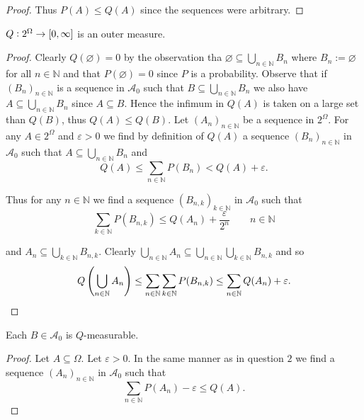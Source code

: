 \begin{enumerate}[label = \textbf{Exercise \arabic*.},wide = 0pt, itemsep=1.5ex]
\begin{proof}
			Thus $P(A) \leq Q(A)$ since the sequences were arbitrary.
		\end{proof}
		\begin{lemma}
			$Q: 2^\Omega \to \intcc{0,\infty}$ is an outer measure.
		\end{lemma}
		\begin{proof}
		Clearly $Q(\varnothing) = 0$ by the observation tha $\varnothing \subseteq \bigcup_{n \in \mathbb{N}} B_n$ where $B_n := \varnothing$ for all $n \in \mathbb{N}$ and that $P(\varnothing) = 0$ since $P$ is a probability. Observe that if $(B_n)_{n \in \mathbb{N}}$ is a sequence in $\mathcal{A}_0$ such that $B \subseteq \bigcup_{n \in \mathbb{N}}B_n$ we also have $A \subseteq \bigcup_{n \in \mathbb{N}}B_n$ since $A \subseteq B$. Hence the infimum in $Q(A)$ is taken on a large set than $Q(B)$, thus $Q(A) \leq Q(B)$. Let $(A_n)_{n \in \mathbb{N}}$ be a sequence in $2^\Omega$. For any $A \in 2^\Omega$ and $\varepsilon > 0$ we find by definition of $Q(A)$ a sequence $(B_n)_{n \in \mathbb{N}}$ in $\mathcal{A}_0$ such that $A \subseteq \bigcup_{n \in \mathbb{N}} B_n$ and 
		\begin{equation}
			Q(A) \leq \sum_{n \in \mathbb{N}} P(B_n) < Q(A) + \varepsilon.
		\end{equation}

		Thus for any $n \in \mathbb{N}$ we find a sequence $(B_{n,k})_{k \in \mathbb{N}}$ in $\mathcal{A}_0$ such that
		\begin{equation}
			\sum_{k \in \mathbb{N}} P(B_{n,k}) \leq Q(A_n) + \frac{\varepsilon}{2^n} \qquad n \in \mathbb{N}  
		\end{equation}

		\noindent and $A_n \subseteq \bigcup_{k \in \mathbb{N}} B_{n,k}$. Clearly $\bigcup_{n \in \mathbb{N}} A_n \subseteq \bigcup_{n \in \mathbb{N}}\bigcup_{k \in \mathbb{N}} B_{n,k}$ and so
		\begin{equation}
			Q\del[4]{\bigcup_{n \in \mathbb{N}} A_n} \leq \sum_{n \in \mathbb{N}}\sum_{k \in \mathbb{N}} P(B_{n,k}) \leq \sum\limits_{n \in \mathbb{N}}Q(A_n) + \varepsilon.
		\end{equation} 
	\end{proof}

	\begin{lemma}
		Each $B \in \mathcal{A}_0$ is $Q$-measurable.
	\end{lemma}

	\begin{proof}
		Let $A \subseteq \Omega$. Let $\varepsilon > 0$. In the same manner as in question $2$ we find a sequence $(A_n)_{n \in \mathbb{N}}$ in $\mathcal{A}_0$ such that 
		\begin{equation}
			\sum_{n \in \mathbb{N}} P(A_n) - \varepsilon \leq Q(A).
		\end{equation}


\end{proof}
\end{enumerate}
